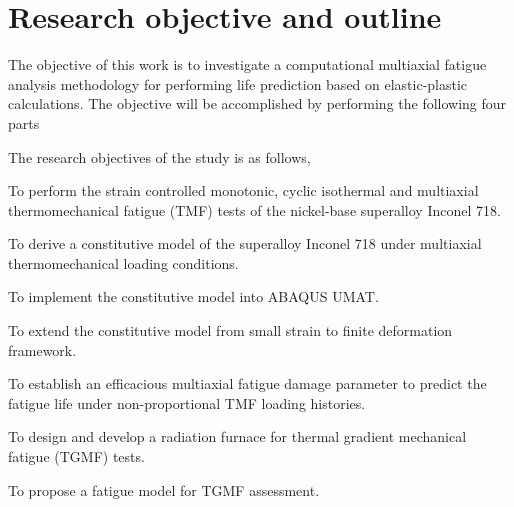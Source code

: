 %



\section{Research objective and outline}
\noindent
The objective of this work is to investigate a computational multiaxial fatigue analysis methodology for performing life prediction based on elastic-plastic calculations. The objective will be accomplished by performing the following four parts

The research objectives of the study is as follows,
\begin{list}{.}
  {
  \setlength{\rightmargin}{\leftmargin}}
    \item To perform the strain controlled monotonic, cyclic isothermal and multiaxial thermomechanical fatigue (TMF) tests of the nickel-base superalloy Inconel 718.
    \item To derive a constitutive model of the superalloy Inconel 718 under multiaxial thermomechanical loading conditions.
    \item To implement the constitutive model into ABAQUS UMAT.
    \item To extend the constitutive model from small strain to finite deformation framework.
    \item To establish an efficacious multiaxial fatigue damage parameter to predict the fatigue life under non-proportional TMF loading histories.
    \item To design and develop a radiation furnace for thermal gradient mechanical fatigue (TGMF) tests.
    \item To propose a fatigue model for TGMF assessment.
\end{list}

